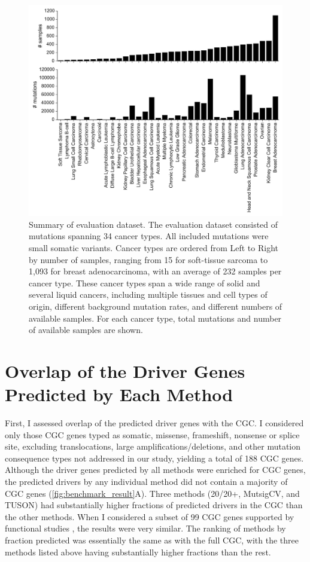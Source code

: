 \begin{figure}
  \centering
  \makeatletter
  \let\@currsize\normalsize
  \includegraphics[width=0.9\linewidth]{figures/chapter4/study_size.jpg}
  \caption{Summary of evaluation dataset. The evaluation dataset consisted of mutations spanning 34 cancer types. All included mutations were small somatic variants. Cancer types are ordered from Left to Right by number of samples, ranging from 15 for soft-tissue sarcoma to 1,093 for breast adenocarcinoma, with an average of 232 samples per cancer type. These cancer types span a wide range of solid and several liquid cancers, including multiple tissues and cell types of origin, different background mutation rates, and different numbers of available samples. For each cancer type, total mutations and number of available samples are shown.}
  \label{fig:benchmark_data}
\end{figure}

\section{Overlap of the Driver Genes Predicted by Each Method}

First, I assessed overlap of the predicted driver genes with the CGC. I considered only those CGC genes typed as somatic, missense, frameshift, nonsense or splice site, excluding translocations, large amplifications/deletions, and other mutation consequence types not addressed in our study, yielding a total of 188 CGC genes. Although the driver genes predicted by all methods were enriched for CGC genes, the predicted drivers by any individual method did not contain a majority of CGC genes (\autoref{fig:benchmark_result}A). Three methods (20/20+, MutsigCV, and TUSON) had substantially higher fractions of predicted drivers in the CGC than the other methods. When I considered a subset of 99 CGC genes supported by functional studies \cite{RN99}, the results were very similar. The ranking of methods by fraction predicted was essentially the same as with the full CGC, with the three methods listed above having substantially higher fractions than the rest.

